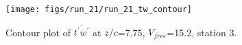 \begin{figure}[H]
\centering
\texttt{[image: figs/run\_21/run\_21\_tw\_contour]}
\caption{Contour plot of $\overline{t^\prime w^\prime}$ at $z/c$=7.75, $V_{free}$=15.2, station 3.}
\label{fig:run_21_tw_contour}
\end{figure}


